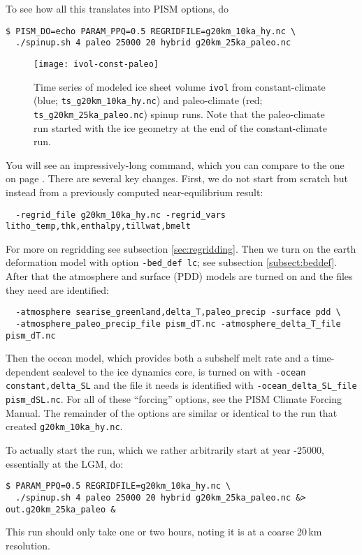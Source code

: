 To see how all this translates into PISM options, do
\begin{verbatim}
$ PISM_DO=echo PARAM_PPQ=0.5 REGRIDFILE=g20km_10ka_hy.nc \
  ./spinup.sh 4 paleo 25000 20 hybrid g20km_25ka_paleo.nc
\end{verbatim}

\begin{figure}[ht]
\centering
\texttt{[image: ivol-const-paleo]}
\caption{Time series of modeled ice sheet volume \texttt{ivol} from constant-climate (blue; \texttt{ts_g20km_10ka_hy.nc}) and paleo-climate (red; \texttt{ts_g20km_25ka_paleo.nc}) spinup runs.  Note that the paleo-climate run started with the ice geometry at the end of the constant-climate run.}
\label{fig:ivolconstpaleo}
\end{figure}

You will see an impressively-long command, which you can compare to the one on page \pageref{firstcommand}.  There are several key changes.  First, we do not start from scratch but instead from a previously computed near-equilibrium result:
\begin{verbatim}
  -regrid_file g20km_10ka_hy.nc -regrid_vars litho_temp,thk,enthalpy,tillwat,bmelt
\end{verbatim}
For more on regridding see subsection \ref{sec:regridding}.  Then we turn on the earth deformation model with option \verb|-bed_def lc|; see subsection \ref{subsect:beddef}.  After that the atmosphere and surface (PDD) models are turned on and the files they need are identified:
\begin{verbatim}
  -atmosphere searise_greenland,delta_T,paleo_precip -surface pdd \
  -atmosphere_paleo_precip_file pism_dT.nc -atmosphere_delta_T_file pism_dT.nc
\end{verbatim}
Then the ocean model, which provides both a subshelf melt rate and a time-dependent sealevel to the ice dynamics core, is turned on with \verb|-ocean constant,delta_SL| and the file it needs is identified with \verb|-ocean_delta_SL_file pism_dSL.nc|.  For all of these ``forcing'' options, see the PISM Climate Forcing Manual.  The remainder of the options are similar or identical to the run that created \verb|g20km_10ka_hy.nc|.

To actually start the run, which we rather arbitrarily start at year -25000, essentially at the LGM, do:
\begin{verbatim}
$ PARAM_PPQ=0.5 REGRIDFILE=g20km_10ka_hy.nc \
  ./spinup.sh 4 paleo 25000 20 hybrid g20km_25ka_paleo.nc &> out.g20km_25ka_paleo &
\end{verbatim}
This run should only take one or two hours, noting it is at a coarse 20\,km resolution.

